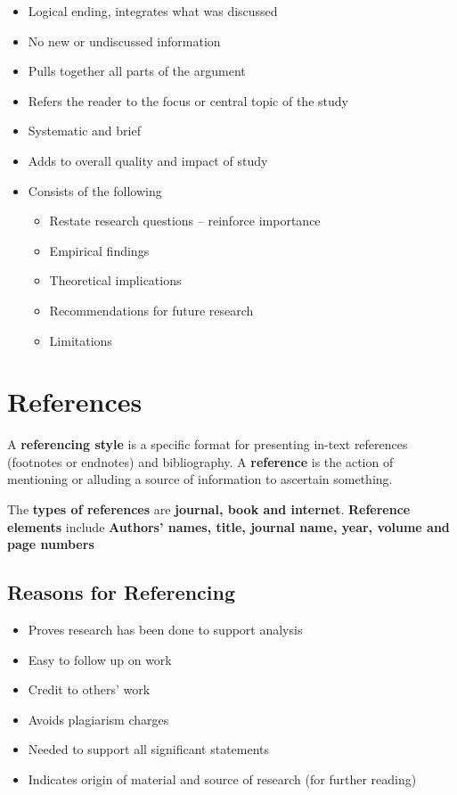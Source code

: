 \documentclass{article}
\begin{document}
\begin{itemize}
    \item Logical ending, integrates what was discussed
    \item No new or undiscussed information
    \item Pulls together all parts of the argument
    \item Refers the reader to the focus or central topic of the study
    \item Systematic and brief
    \item Adds to overall quality and impact of study
    \item Consists of the following
    \begin{itemize}
        \item Restate research questions -- reinforce importance
        \item Empirical findings
        \item Theoretical implications
        \item Recommendations for future research
        \item Limitations
    \end{itemize}
\end{itemize}

\section{References}

A \textbf{referencing style} is a specific format for presenting in-text references (footnotes or endnotes) and bibliography. A \textbf{reference} is the action of mentioning or alluding a source of information to ascertain something.

The \textbf{types of references} are \textbf{journal, book and internet}. \textbf{Reference elements} include \textbf{Authors' names, title, journal name, year, volume and page numbers}

\subsection{Reasons for Referencing}

\begin{itemize}
    \item Proves research has been done to support analysis
    \item Easy to follow up on work
    \item Credit to others' work
    \item Avoids plagiarism charges
    \item Needed to support all significant statements
    \item Indicates origin of material and source of research (for further reading)
\end{itemize}
\end{document}
